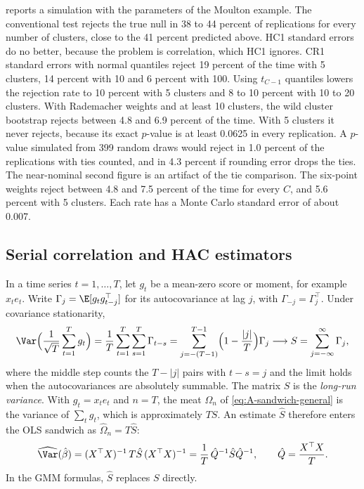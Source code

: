  reports a simulation with the parameters of the Moulton example. The conventional test
rejects the true null in 38 to 44 percent of replications for every number of clusters, close to the 41 percent
predicted above. HC1 standard errors do no better, because the problem is correlation, which HC1 ignores.
CR1 standard errors with normal quantiles reject 19 percent of the time with 5 clusters, 14 percent with 10 and 6
percent with 100. Using $t_{C-1}$ quantiles lowers the rejection rate to 10 percent with 5 clusters and 8 to 10
percent with 10 to 20 clusters. With Rademacher weights and at least 10 clusters, the wild cluster bootstrap rejects
between 4.8 and 6.9 percent of the time. With 5 clusters it never rejects, because its exact $p$-value is at least
0.0625 in every replication. A $p$-value simulated from 399 random draws would reject in 1.0 percent of the
replications with ties counted, and in 4.3 percent if rounding error drops the ties. The near-nominal second
figure is an artifact of the tie comparison. The six-point weights reject between 4.8 and 7.5 percent of the time
for every $C$, and 5.6 percent with 5 clusters. Each rate has a Monte Carlo standard error of about 0.007.

\subsection{Serial correlation and HAC estimators}\label{sec:A-hac}

In a time series $t = 1, \dots, T$, let $g_t$ be a mean-zero score or moment, for example $x_te_t$. Write
$\Gamma_j = \E[g_tg_{t-j}^\top]$ for its autocovariance at lag $j$, with $\Gamma_{-j} = \Gamma_j^\top$. Under
covariance stationarity,
\begin{equation*}
  \Var\Bigl(\frac{1}{\sqrt T}\sum_{t=1}^{T}g_t\Bigr) = \frac{1}{T}\sum_{t=1}^{T}\sum_{s=1}^{T}\Gamma_{t-s}
  = \sum_{j=-(T-1)}^{T-1}\Bigl(1 - \frac{|j|}{T}\Bigr)\Gamma_j \longrightarrow S = \sum_{j=-\infty}^{\infty}\Gamma_j,
\end{equation*}
where the middle step counts the $T - |j|$ pairs with $t - s = j$ and the limit holds when the autocovariances are
absolutely summable. The matrix $S$ is the \emph{long-run variance}. With $g_t = x_te_t$ and $n = T$, the meat
$\Omega_n$ of \eqref{eq:A-sandwich-general} is the variance of $\sum_tg_t$, which is approximately $TS$. An estimate
$\hat S$ therefore enters the OLS sandwich as $\hat\Omega_n = T\hat S$:
\begin{equation*}
  \widehat\Var(\hat\beta) = (X^\top X)^{-1}\,T\hat S\,(X^\top X)^{-1} = \frac{1}{T}\,\hat Q^{-1}\hat S\hat Q^{-1},
  \qquad \hat Q = \frac{X^\top X}{T}.
\end{equation*}
In the GMM formulas, $\hat S$ replaces $S$ directly.

